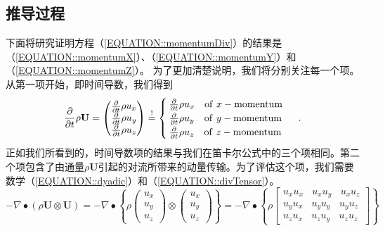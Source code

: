 \documentclass[MathematicsNumericsDerivationsAndOpenFOAM.tex]{subfiles}
\begin{document}
\subsection{推导过程}
%
%
    下面将研究证明方程（\ref{EQUATION::momentumDiv}）的结果是（\ref{EQUATION::momentumX}）、（\ref{EQUATION::momentumY}）和（\ref{EQUATION::momentumZ}）。
%
%
    为了更加清楚说明，我们将分别关注每一个项。从第一项开始，即时间导数，我们得到
%
%
\begin{equation}
  \frac{\partial}{\partial t} \rho \textbf{U}
=
  \left(
  \begin{matrix}
      \frac{\partial}{\partial t} \rho u_x \\
      \frac{\partial}{\partial t} \rho u_y \\
      \frac{\partial}{\partial t} \rho u_z
  \end{matrix}
  \right)
\overset{!}{=}
\begin{cases}
  \frac{\partial}{\partial t} \rho u_x  ~~~ \mathrm{of~}x-\mathrm{momentum}\\
  \frac{\partial}{\partial t} \rho u_y  ~~~ \mathrm{of~}y-\mathrm{momentum}\\
  \frac{\partial}{\partial t} \rho u_z  ~~~ \mathrm{of~}z-\mathrm{momentum}
\end{cases} ~.
\end{equation}
%
%
    正如我们所看到的，时间导数项的结果与我们在笛卡尔公式中的三个项相同。第二个项包含了由通量$\rho\textbf{U}$引起的对流所带来的动量传输。为了评估这个项，我们需要数学（\ref{EQUATION::dyadic}）和（\ref{EQUATION::divTensor}）。
%
%
\begin{equation*}
 -   \nabla \bullet \left(\rho\textbf{U} \otimes \textbf{U}\right)
=
-   \nabla \bullet
  \left\{
  \rho
  \left(
  \begin{matrix}
    u_x \\
    u_y \\
    u_z
  \end{matrix}
  \right)
\otimes
\left(
  \begin{matrix}
    u_x \\
    u_y \\
    u_z
  \end{matrix}
  \right)
  \right\}
=
-   \nabla \bullet
  \left\{
  \rho
  \left[
  \begin{matrix}
    u_x u_x ~~~~ u_x u_y ~~~~ u_x u_z \\
    u_y u_x ~~~~ u_y u_y ~~~~ u_y u_z \\
    u_z u_x ~~~~ u_z u_y ~~~~ u_z u_z
  \end{matrix}
  \right]
  \right\}
\end{equation*}
\end{document}
